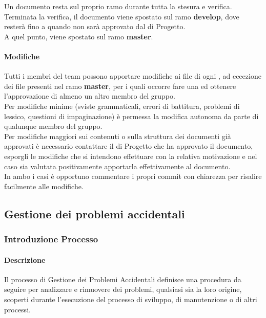                 Un documento resta sul proprio ramo durante tutta la stesura e verifica.  \\
                Terminata la verifica, il documento viene spostato sul ramo \textbf{develop}, dove resterà fino a quando non sarà approvato dal  di Progetto. \\
                A quel punto, viene spostato sul ramo \textbf{master}.
                
            \paragraph{ Modifiche}
                Tutti i membri del team possono apportare modifiche ai file di ogni , ad eccezione dei file presenti nel ramo \textbf{master}, per i quali occorre fare una  ed ottenere l’approvazione di almeno un altro membro del gruppo. \\
                Per modifiche minime (sviste grammaticali, errori di battitura, problemi di lessico, questioni di impaginazione) è permessa la modifica autonoma da parte di qualunque membro del gruppo. \\
                Per modifiche maggiori sui contenuti o sulla struttura dei documenti già approvati è necessario contattare il  di Progetto che ha approvato il documento, esporgli le modifiche che si intendono effettuare con la relativa motivazione e nel caso sia valutata positivamente apportarla effettivamente al documento.\\
                In ambo i casi è opportuno commentare i propri commit con chiarezza per risalire facilmente alle modifiche.\\

    \subsection{Gestione dei problemi accidentali}
        \subsubsection{Introduzione Processo}
            \paragraph{Descrizione}
                Il processo di Gestione dei Problemi Accidentali definisce una procedura da seguire per analizzare e rimuovere dei problemi, qualsiasi sia la loro origine, scoperti durante l'esecuzione del processo di sviluppo, di manutenzione o di altri processi.
